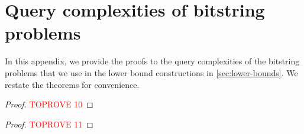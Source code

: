 \documentclass[11pt]{article}
\begin{document}
    
    

    \appendix

    \section{Query complexities of bitstring problems}
    \label{app:bit-string-problems}

    In this appendix, we provide the proofs to the query complexities of the bitstring problems that we use in the lower bound constructions in \cref{sec:lower-bounds}. We restate the theorems for convenience.

    \bitstringrecovery*

    \begin{proof}\textcolor{red}{TOPROVE 10}\end{proof}

    \hammingweightestimation*

    \begin{proof}\textcolor{red}{TOPROVE 11}\end{proof}
\end{document}
